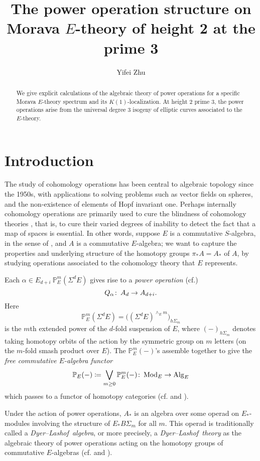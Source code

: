 \documentclass{gtpart}
\title{The power operation structure on Morava $E$-theory of height 2 at the prime 3}
\author{Yifei Zhu}
\theoremstyle{definition}
\theoremstyle{remark}
\def\co{\colon\thinspace}
\newcommand{\mb}[1]{\mathbb{#1}}
\newcommand{\Mod}{{\rm Mod}}
\newcommand{\Alg}{{\rm Alg}}
\newcommand{\cff}[2]{cf.\thinspace{\cite[#1]{#2}}}
\newcommand{\DL}{Dyer--Lashof~}
\newcommand{\BP}{{\mb P}}
\newcommand{\A}{\alpha}
\begin{document}
\begin{abstract}
 We give explicit calculations of the algebraic theory of power operations for a specific Morava $E$-theory spectrum and its $K(1)$-localization.  
 At height 2 prime 3, the power operations arise from the universal degree 3 isogeny of elliptic curves associated to the $E$-theory.  
\end{abstract}


\maketitle
\section{Introduction}
\label{sec:intro}

The study of cohomology operations has been central to algebraic topology 
since the 1950s, with applications to solving problems such as vector fields 
on spheres, and the non-existence of elements of Hopf invariant one.  
Perhaps internally cohomology operations are primarily used to cure the blindness of cohomology theories \cite{blind}, 
that is, to cure their varied degrees of inability to detect the fact that a map of spaces is essential.  
In other words, suppose $E$ is a commutative $S$-algebra, in the sense of \cite{EKMM}, and $A$ is a commutative $E$-algebra; 
we want to capture the properties and underlying structure of the homotopy groups $\pi_* A = A_*$ of $A$, 
by studying operations associated to the cohomology theory that $E$ represents.  

Each $\A \in E_{d+i}~\BP_E^m (\Sigma^d E)$ gives rise to a {\em power operation} (\cff{section IX.1}{H_infty})
\[
 Q_\A \co A_d \to A_{d+i}.  
\]
Here 
\[
 \BP_E^m (\Sigma^d E) = \big( (\Sigma^d E)^{\wedge_E m} \big)_{h \Sigma_m}
\]
is the $m$th extended power of the $d$-fold suspension of $E$, 
where $(-)_{h \Sigma_m}$ denotes taking homotopy orbits of the action by the symmetric group on $m$ letters (on the $m$-fold smash product over $E$).  
The $\BP_E^m (-)$'s assemble together to give the {\em free commutative $E$-algebra functor} 
\[
 \BP_E (-) \coloneqq \bigvee_{m \geq 0} \BP_E^m (-) \co \Mod_E \to \Alg_E 
\]
which passes to a functor of homotopy categories (\cff{section I.2}{H_infty} and \cite[3.15]{cong}).  

Under the action of power operations, $A_*$ is an algebra over some operad on $E_*$-modules involving the structure of $E_* B\Sigma_m$ for all $m$.  
This operad is traditionally called a {\em \DL algebra}, or more precisely, 
a {\em \DL theory} as the algebraic theory of power operations acting on the homotopy groups of commutative $E$-algebras 
(\cff{chapters III, VIII, and IX}{H_infty} and \cite[section 9]{lpo}).  
\end{document}
